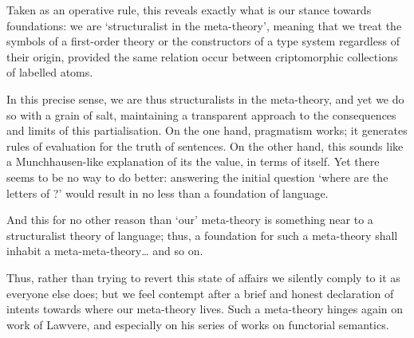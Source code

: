 Taken as an operative rule, this reveals exactly what is our stance towards foundations: we are `structuralist in the meta-theory', meaning that we treat the symbols of a first-order theory or the constructors of a type system regardless of their origin, provided the same relation occur between criptomorphic collections of labelled atoms.

In this precise sense, we are thus structuralists in the meta-theory, and yet we do so with a grain of salt, maintaining a transparent approach to the consequences and limits of this partialisation. On the one hand, pragmatism works; it generates rules of evaluation for the truth of sentences. On the other hand, this sounds like a Munchhausen-like explanation of its the value, in terms of itself. Yet there seems to be no way to do better: answering the initial question `where are the letters of ?' would result in no less than a foundation of language.

And this for no other reason than `our' meta-theory is something near to a structuralist theory of language; thus, a foundation for such a meta-theory shall inhabit a meta-meta-theory\dots{} and so on.

Thus, rather than trying to revert this state of affairs we silently comply to it as everyone else does; but we feel contempt after a brief and honest declaration of intents towards where our meta-theory lives. Such a meta-theory hinges again on work of Lawvere, and especially on his series of works on functorial semantics.
